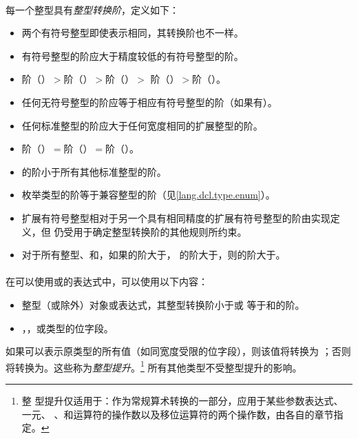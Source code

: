 {\paragraph{}
每一个整型具有\textit{整型转换阶}，定义如下：
\begin{itemize}
  \item{两个有符号整型即使表示相同，其转换阶也不一样。}
  \item{有符号整型的阶应大于精度较低的有符号整型的阶。}
  \item{阶（）$>$阶（）$>$阶（）$>$
    阶（）$>$阶（）。}
  \item{任何无符号整型的阶应等于相应有符号整型的阶（如果有）。}
  \item{任何标准整型的阶应大于任何宽度相同的扩展整型的阶。}
  \item{阶（）$=$阶（）$=$阶（）。}
  \item{的阶小于所有其他标准整型的阶。}
  \item{枚举类型的阶等于兼容整型的阶（见\ref{lang.dcl.type.enum}）。}
  \item{扩展有符号整型相对于另一个具有相同精度的扩展有符号整型的阶由实现定义，但
    仍受用于确定整型转换阶的其他规则所约束。}
  \item{对于所有整型、和，如果的阶大于，
    的阶大于，则的阶大于。}
\end{itemize}

\paragraph{}
在可以使用或的表达式中，可以使用以下内容：
\begin{itemize}
  \item{整型（或除外）对象或表达式，其整型转换阶小于或
    等于和的阶。}
  \item{，，或类型的位字段。}
\end{itemize}
如果可以表示原类型的所有值（如同宽度受限的位字段），则该值将转换为
；否则将转换为。这些称为\textit{整型提升}。\footnote{整
型提升仅适用于：作为常规算术转换的一部分，应用于某些参数表达式、一元\tm{+}、
\tm{-}、和\tm{\~}运算符的操作数以及移位运算符的两个操作数，由各自的章节指定。}
所有其他类型不受整型提升的影响。

}
